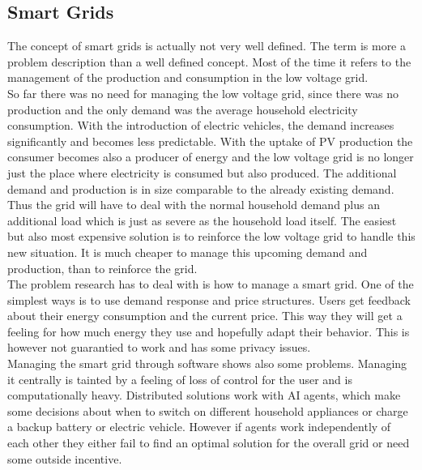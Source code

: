 \documentclass[a4paper]{article}
\begin{document}
\subsection{Smart Grids}
The concept of smart grids is actually not very well defined. The term is more a problem description than a well defined concept. 
Most of the time it refers to the management of the production and consumption in the low voltage grid. \\ 
So far there was no need for managing the low voltage grid, since there was no production and the only demand was the average 
household electricity consumption. With the introduction of electric vehicles, the demand increases significantly and becomes 
less predictable. With the uptake of PV production the consumer becomes also a producer of energy and the low voltage grid is no 
longer just the place where electricity is consumed but also produced. 
The additional demand and production is in size comparable 
to the already existing demand. Thus the grid will have to deal with the normal household demand plus an additional load which is just 
as severe as the household load itself.
The easiest but also most expensive solution is to reinforce the low voltage grid to handle this 
new situation. It is much cheaper to manage this upcoming demand and production, than to reinforce the 
grid.\\
The problem research has to deal with is how to manage a smart grid. One of the simplest ways is to use demand response and price 
structures. Users get feedback about their energy consumption and the current price. This way they will get a feeling for how much 
energy they use and hopefully adapt their behavior. This is however not guarantied to work and has some privacy issues. \\

Managing the smart grid through software shows also some problems. Managing it centrally is tainted by a feeling of loss of 
control for the user and is computationally heavy. Distributed solutions work with AI agents, which make some decisions about 
when to switch on different household appliances or charge a backup battery or electric vehicle. However if agents work independently 
of each other they either fail to find an optimal solution for the overall grid or need some outside incentive.       
\end{document}
